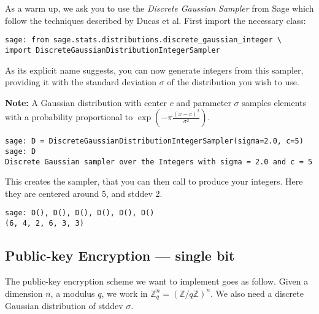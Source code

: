 \documentclass[10pt,a4paper,nobib]{tufte-handout}
\begin{document}
As a warm up, we ask you to use the \textit{Discrete Gaussian Sampler} from Sage which follow the techniques described by Ducas et al. First import the necessary class:

\lstset{language=sage,label= ,caption= ,captionpos=b,numbers=none}
\begin{lstlisting}
sage: from sage.stats.distributions.discrete_gaussian_integer \
import DiscreteGaussianDistributionIntegerSampler
\end{lstlisting}

As its explicit name suggests, you can now generate integers from this sampler, providing it with the standard deviation $\sigma$ of the distribution you wish to use.

\textbf{Note: } A Gaussian distribution with center $c$ and parameter $\sigma$ samples elements with a probability proportional to $\exp(-\pi\frac{(x-c)^2}{\sigma^2})$.

\lstset{language=sage,label= ,caption= ,captionpos=b,numbers=none}
\begin{lstlisting}
sage: D = DiscreteGaussianDistributionIntegerSampler(sigma=2.0, c=5)
sage: D
Discrete Gaussian sampler over the Integers with sigma = 2.0 and c = 5
\end{lstlisting}

This creates the sampler, that you can then call to produce your integers. Here they are centered around 5, and stddev 2.

\lstset{language=sage,label= ,caption= ,captionpos=b,numbers=none}
\begin{lstlisting}
sage: D(), D(), D(), D(), D(), D()
(6, 4, 2, 6, 3, 3)
\end{lstlisting}

\subsection{Public-key Encryption --- single bit}

The public-key encryption scheme we want to implement goes as follow. Given a dimension $n$, a modulus $q$, we work in $\mathbb{Z}^n_q = (\mathbb{Z}/q\mathbb{Z})^n$. We also need a discrete Gaussian distribution of stddev $\sigma$.
\end{document}
